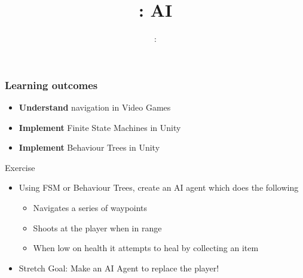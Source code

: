 \usepackage{../../beamerthemeFalmouthGamesAcademy}
\usepackage{multimedia}
\graphicspath{ {../../} }


\usepackage[normalem]{ulem}
\usepackage{wasysym}

\usepackage{pdfpages}

\usetikzlibrary{arrows,automata}

\usepackage{qtree}





\title{\sessionnumber: AI}
\subtitle{\modulecode: \moduletitle}

\frame{\titlepage} 

\begin{frame}
	\frametitle{Learning outcomes}
	\begin{itemize}
		\item \textbf{Understand} navigation in Video Games
		\item \textbf{Implement} Finite State Machines in Unity
		\item \textbf{Implement} Behaviour Trees in Unity
	\end{itemize}
\end{frame}






\begin{frame}{Exercise}
\begin{itemize}
	\item Using FSM or Behaviour Trees, create an AI agent which does the following
	\begin{itemize}
		\item Navigates a series of waypoints
		\item Shoots at the player when in range
		\item When low on health it attempts to heal by collecting an item
	\end{itemize}
	\item Stretch Goal: Make an AI Agent to replace the player!
\end{itemize}
\end{frame}

